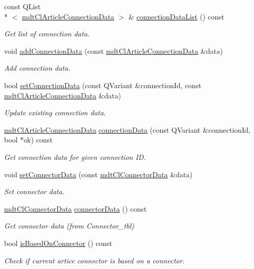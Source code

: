 \begin{DoxyCompactItemize}
const Q\-List\\*
$<$ \hyperlink{classmdt_cl_article_connection_data}{mdt\-Cl\-Article\-Connection\-Data} $>$ \& \hyperlink{classmdt_cl_article_connector_data_a8fddc132f88bcdc62a637b40e1d49feb}{connection\-Data\-List} () const 
\begin{DoxyCompactList}\small\item\em Get list of connection data. \end{DoxyCompactList}\item 
void \hyperlink{classmdt_cl_article_connector_data_ab3c156fb10da85e943a5cc4f8d37fd2d}{add\-Connection\-Data} (const \hyperlink{classmdt_cl_article_connection_data}{mdt\-Cl\-Article\-Connection\-Data} \&data)
\begin{DoxyCompactList}\small\item\em Add connection data. \end{DoxyCompactList}\item 
bool \hyperlink{classmdt_cl_article_connector_data_a53336ffc604daecd55f070910beef474}{set\-Connection\-Data} (const Q\-Variant \&connection\-Id, const \hyperlink{classmdt_cl_article_connection_data}{mdt\-Cl\-Article\-Connection\-Data} \&data)
\begin{DoxyCompactList}\small\item\em Update existing connection data. \end{DoxyCompactList}\item 
\hyperlink{classmdt_cl_article_connection_data}{mdt\-Cl\-Article\-Connection\-Data} \hyperlink{classmdt_cl_article_connector_data_a8d773cc831a196e6f41f9436aa0c919d}{connection\-Data} (const Q\-Variant \&connection\-Id, bool $\ast$ok) const 
\begin{DoxyCompactList}\small\item\em Get connection data for given connection I\-D. \end{DoxyCompactList}\item 
void \hyperlink{classmdt_cl_article_connector_data_a5e6c1f12ff83365cb5c54537a06baf30}{set\-Connector\-Data} (const \hyperlink{classmdt_cl_connector_data}{mdt\-Cl\-Connector\-Data} \&data)
\begin{DoxyCompactList}\small\item\em Set connector data. \end{DoxyCompactList}\item 
\hyperlink{classmdt_cl_connector_data}{mdt\-Cl\-Connector\-Data} \hyperlink{classmdt_cl_article_connector_data_a11a153cfc2384c8c41a37bdf3df30fad}{connector\-Data} () const 
\begin{DoxyCompactList}\small\item\em Get connector data (from Connector\-\_\-tbl) \end{DoxyCompactList}\item 
bool \hyperlink{classmdt_cl_article_connector_data_a86fc3587f3718b68bd8aa32e6a2b3116}{is\-Based\-On\-Connector} () const 
\begin{DoxyCompactList}\small\item\em Check if current artice connector is based on a connector. \end{DoxyCompactList}\end{DoxyCompactItemize}
